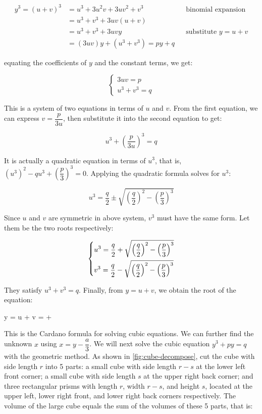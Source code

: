 \documentclass[b5paper]{article}
\begin{document}
\begin{align*}
y^3 = (u + v)^3 &= u^3 + 3u^2v + 3uv^2 + v^3 && \text{binomial expansion} \\
  &= u^3 + v^3 + 3uv(u + v) \\
  &= u^3 + v^3 + 3uvy && \text{substitute } y = u + v \\
  &= (3uv)y + (u^3 + v^3) = py + q
\end{align*}

equating the coefficients of $y$ and the constant terms, we get:

\[
\begin{cases}
  3uv = p \\
  u^3 + v^3 = q
\end{cases}
\]

This is a system of two equations in terms of $u$ and $v$. From the first equation, we can express $v = \dfrac{p}{3u}$, then substitute it into the second equation to get:

\[
u^3 + (\frac{p}{3u})^3 = q
\]

It is actually a quadratic equation in terms of $u^3$, that is, $(u^3)^2 - qu^3 + (\dfrac{p}{3})^3 = 0$. Applying the quadratic formula solves for $u^3$:

\[
u^3 = \frac{q}{2} \pm \sqrt{\left(\frac{q}{2}\right)^2 - \left(\frac{p}{3}\right)^3}
\]

Since $u$ and $v$ are symmetric in above system, $v^3$ must have the same form. Let them be the two roots respectively:

\[
\begin{dcases}
u^3 = \dfrac{q}{2} + \sqrt{\left(\dfrac{q}{2}\right)^2 - \left(\dfrac{p}{3}\right)^3} \\
v^3 = \dfrac{q}{2} - \sqrt{\left(\dfrac{q}{2}\right)^2 - \left(\dfrac{p}{3}\right)^3}
\end{dcases}
\]

They satisfy $u^3 + v^3 = q$. Finally, from $y = u + v$, we obtain the root of the equation:

\be \label{eq:cardano}
y = u + v =  + 
\ee

 \label{sec:geometric-cubic-solution}
This is the Cardano formula for solving cubic equations. We can further find the unknown $x$ using $x = y - \dfrac{a}{3}$. We will next solve the cubic equation $y^3 + py = q$ with the geometric method. As shown in \cref{fig:cube-decompose}, cut the cube with side length $r$ into 5 parts: a small cube with side length $r-s$ at the lower left front corner; a small cube with side length $s$ at the upper right back corner; and three rectangular prisms with length $r$, width $r-s$, and height $s$, located at the upper left, lower right front, and lower right back corners respectively. The volume of the large cube equals the sum of the volumes of these 5 parts, that is:
\end{document}
